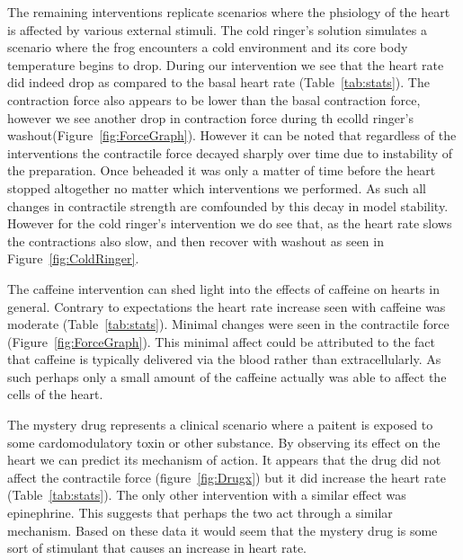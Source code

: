 \documentclass[12pt]{article}
\begin{document}
\par{}
The remaining interventions replicate scenarios where the phsiology of the heart is affected by various external stimuli. The cold ringer's solution simulates a scenario where the frog encounters a cold environment and its core body temperature begins to drop. During our intervention we see that the heart rate did indeed drop as compared to the basal heart rate (Table~\ref{tab:stats}). The contraction force also appears to be lower than the basal contraction force, however we see another drop in contraction force during th ecolld ringer's washout(Figure~\ref{fig:ForceGraph}). However it can be noted that regardless of the interventions the contractile force decayed sharply over time due to instability of the preparation. Once beheaded it was only a matter of time before the heart stopped altogether no matter which interventions we performed. As such all changes in contractile strength are comfounded by this decay in model stability. However for the cold ringer's intervention we do see that, as the heart rate slows the contractions also slow, and then recover with washout as seen in Figure~\ref{fig:ColdRinger}.
\par{}
The caffeine intervention can shed light into the effects of caffeine on hearts in general. Contrary to expectations the heart rate increase seen with caffeine was moderate (Table~\ref{tab:stats}). Minimal changes were seen in the contractile force (Figure~\ref{fig:ForceGraph}). This minimal affect could be attributed to the fact that caffeine is typically delivered via the blood rather than extracellularly. As such perhaps only a small amount of the caffeine actually was able to affect the cells of the heart.

\par{}
The mystery drug represents a clinical scenario where a paitent is exposed to some cardomodulatory toxin or other substance. By observing its effect on the heart we can predict its mechanism of action. It appears that the drug did not affect the contractile force (figure~\ref{fig:Drugx}) but it did increase the heart rate (Table~\ref{tab:stats}). The only other intervention with a similar effect was epinephrine. This suggests that perhaps the two act through a similar mechanism. Based on these data it would seem that the mystery drug is some sort of stimulant that causes an increase in heart rate.
\end{document}
